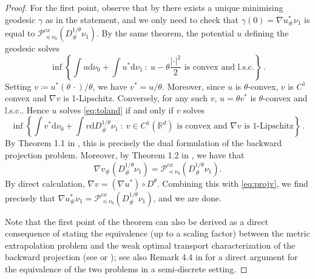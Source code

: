 \documentclass[12pt]{amsart}
\def\ed{\mathrm{d}}
\begin{document}
\begin{proof} For the first point, observe that by \cite[Theorem 2.6]{Gallouet2025} there exists a unique minimising geodesic $\gamma$ as in the statement, and we only need to check that $\gamma(0) = \nabla u^*_\# \nu_1$ is equal to $\mathscr{P}^{cx}_{\preceq \nu_0} (D^{1/\theta}_\# \nu_1)$. By the same theorem, the potential $u$ defining the geodesic solves
	\begin{equation}\label{eq:toland}
	\inf\left\{ \int u \ed \nu_0 + \int u^* \ed \nu_1 ~:~ u -\theta\frac{|\cdot|^2}{2} \text{ is convex and l.s.c.} \right\}\,.
	\end{equation}
Setting $v\coloneqq  u^*( \theta\,\cdot)/\theta$, we have $v^* = u/\theta$. Moreover, since $u$ is $\theta$-convex, $v$ is $C^1$ convex and $\nabla v$ is 1-Lipschitz. Conversely, for any such $v$, $u = \theta v^*$ is $\theta$-convex and l.s.c.. Hence $u$ solves \eqref{eq:toland} if and only if $v$ solves
	\[
\inf\left\{ \int  v^* \ed \nu_0 + \int  v \ed D^{1/\theta}_\# \nu_1 ~:~ v\in C^1(\mathbb{R}^d) \text{ is convex and } \nabla v \text{ is 1-Lipschitz}  \right\}\,.
\]
By Theorem 1.1 in \cite{gozlan2020mixture}, this is precisely the dual formulation of the backward projection problem. Moreover, by Theorem 1.2 in \cite{gozlan2020mixture}, we have that 
\begin{equation}\label{eq:projv}
\nabla v_\# (D^{1/\theta}_\# \nu_1) = \mathscr{P}^{cx}_{\preceq \nu_0}(D^{1/\theta}_\#\nu_1).
\end{equation} By direct calculation, $\nabla v = (\nabla u^*) \circ D^\theta$. Combining this with \eqref{eq:projv}, we find precisely that $\nabla u^*_\# \nu_1 =  \mathscr{P}^{cx}_{\preceq \nu_0}(D^{1/\theta}_\# \nu_1)$, and we are done.


{ Note that the first point of the theorem can also be derived  as a direct consequence of \cite[Theorem 3.3]{Gallouet2025} stating the equivalence (up to a scaling factor) between the metric extrapolation problem and the weak optimal transport characterization of the backward projection (see \cite[Proposition 1.1]{gozlan2020mixture}} or \cite[Theorem 2.1]{alfonsi2020sampling}); see also Remark 4.4 in  \cite{bourne2025semi} for a direct argument for the equivalence of the two problems in a semi-discrete setting.  


\end{proof}
\end{document}
